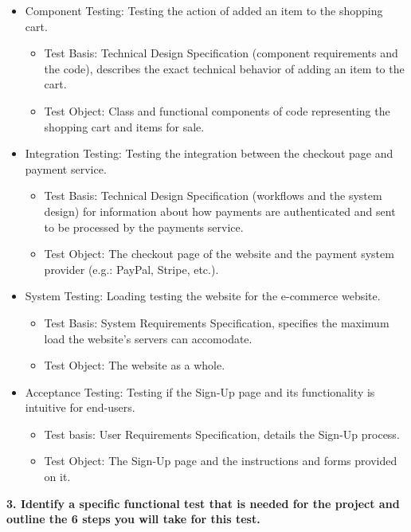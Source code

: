 \documentclass[a4paper,man,natbib]{apa6}
\begin{document}
\begin{itemize}
  \item Component Testing:  Testing the action of added an item to the shopping cart.
  \begin{itemize}
    \item	Test Basis: Technical Design Specification (component requirements and the code), describes the exact technical behavior of adding an item to the cart.
    \item	Test Object: Class and functional components of code representing the shopping cart and items for sale.
  \end{itemize}

  \item Integration Testing: Testing the integration between the checkout page and payment service.
  \begin{itemize}
    \item Test Basis: Technical Design Specification (workflows and the system design) for information about how payments are authenticated and sent to be processed by the payments service.
    \item	Test Object: The checkout page of the website and the payment system provider (e.g.: PayPal, Stripe, etc.).
  \end{itemize}

  \item System Testing: Loading testing the website for the e-commerce website.
  \begin{itemize}
    \item	Test Basis: System Requirements Specification, specifies the maximum load the website’s servers can accomodate.
    \item	Test Object: The website as a whole.
  \end{itemize}

  \item Acceptance Testing: Testing if the Sign-Up page and its functionality is intuitive for end-users.
  \begin{itemize}
    \item	Test basis: User Requirements Specification, details the Sign-Up process.
    \item	Test Object: The Sign-Up page and the instructions and forms provided on it.
  \end{itemize}
\end{itemize}

\pagebreak
\noindent
\textbf{3. Identify a specific functional test that is needed for the project and outline the 6 steps you will take for this test.}\\
\end{document}

